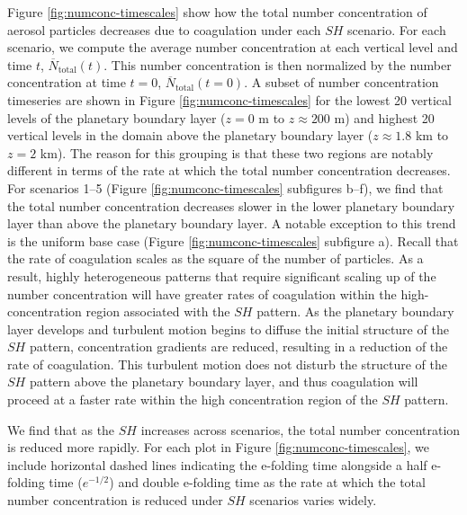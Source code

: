 Figure \ref{fig:numconc-timescales} show how the total number concentration of aerosol particles decreases due to coagulation under each $SH$ scenario. For each scenario, we compute the average number concentration at each vertical level and time $t$, $\overline{N}_{\text{total}}(t)$. This number concentration is then normalized by the number concentration at time $t=0$, $\overline{N}_{\text{total}}(t=0)$. A subset of number concentration timeseries are shown in Figure \ref{fig:numconc-timescales} for the lowest 20 vertical levels of the planetary boundary layer ($z=0$ m to $z\approx200$ m) and highest 20 vertical levels in the domain above the planetary boundary layer ($z\approx1.8$ km to $z=2$ km). The reason for this grouping is that these two regions are notably different in terms of the rate at which the total number concentration decreases. For scenarios 1--5 (Figure \ref{fig:numconc-timescales} subfigures b--f), we find that the total number concentration decreases slower in the lower planetary boundary layer than above the planetary boundary layer. A notable exception to this trend is the uniform base case (Figure \ref{fig:numconc-timescales} subfigure a). Recall that the rate of coagulation scales as the square of the number of particles. As a result, highly heterogeneous patterns that require significant scaling up of the number concentration will have greater rates of coagulation within the high-concentration region associated with the $SH$ pattern. As the planetary boundary layer develops and turbulent motion begins to diffuse the initial structure of the $SH$ pattern, concentration gradients are reduced, resulting in a reduction of the rate of coagulation. This turbulent motion does not disturb the structure of the $SH$ pattern above the planetary boundary layer, and thus coagulation will proceed at a faster rate within the high concentration region of the $SH$ pattern.

We find that as the $SH$ increases across scenarios, the total number concentration is reduced more rapidly. For each plot in Figure \ref{fig:numconc-timescales}, we include horizontal dashed lines indicating the e-folding time alongside a half e-folding time ($e^{-1/2}$) and double e-folding time as the rate at which the total number concentration is reduced under $SH$ scenarios varies widely.  


